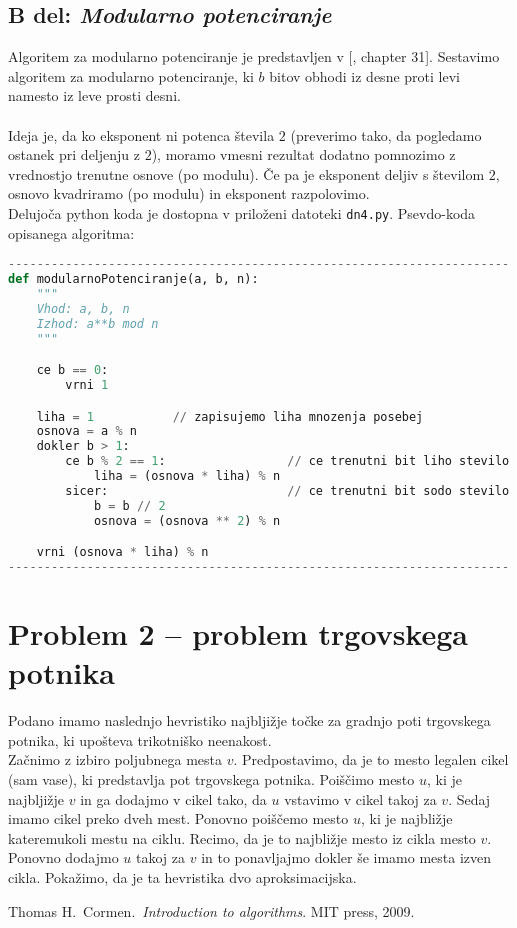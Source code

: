 \documentclass[a4paper,11pt]{article}
\begin{document}
\subsection*{B del: \textit{Modularno potenciranje}}
Algoritem za modularno potenciranje je predstavljen v [\cite{vir}, chapter 31]. Sestavimo algoritem za modularno potenciranje, ki $b$ bitov obhodi iz desne proti levi namesto iz leve prosti desni.
\\
\\
Ideja je, da ko eksponent ni potenca števila $2$ (preverimo tako, da pogledamo ostanek pri deljenju z $2$), 
moramo vmesni rezultat dodatno pomnozimo z vrednostjo trenutne osnove (po modulu). Če pa je eksponent deljiv s številom $2$, osnovo kvadriramo (po modulu) in eksponent razpolovimo.
\\
Delujoča python koda je dostopna v priloženi datoteki \texttt{dn4.py}. Psevdo-koda opisanega algoritma:
\newpage
\begin{lstlisting}[language = Python]
----------------------------------------------------------------------
def modularnoPotenciranje(a, b, n):
    """
    Vhod: a, b, n
    Izhod: a**b mod n
    """

    ce b == 0:
        vrni 1

    liha = 1           // zapisujemo liha mnozenja posebej
    osnova = a % n      
    dokler b > 1:
        ce b % 2 == 1:                 // ce trenutni bit liho stevilo
            liha = (osnova * liha) % n
        sicer:                         // ce trenutni bit sodo stevilo
            b = b // 2
            osnova = (osnova ** 2) % n

    vrni (osnova * liha) % n
----------------------------------------------------------------------

\end{lstlisting}


\section*{Problem 2 -- problem trgovskega potnika}

Podano imamo naslednjo hevristiko najbljižje točke za gradnjo poti
trgovskega potnika, ki upošteva trikotniško neenakost.
\\
Začnimo z izbiro poljubnega mesta $v$. Predpostavimo, da je to mesto
legalen cikel (sam vase), ki predstavlja pot trgovskega potnika. 
Poiščimo mesto $u$, ki je najbljižje $v$ in ga dodajmo v cikel tako, da $u$ vstavimo v cikel takoj za $v$. 
Sedaj imamo cikel preko dveh mest.
Ponovno poiščemo mesto $u$, ki je najbližje kateremukoli mestu na ciklu. 
Recimo, da je to najbližje mesto iz cikla mesto $v$. Ponovno dodajmo $u$ takoj za $v$ in to ponavljajmo dokler še imamo mesta izven cikla.
Pokažimo, da je ta hevristika dvo aproksimacijska.


\begin{thebibliography}{99}
    Thomas H.~Cormen.~\emph{Introduction to algorithms}. MIT press, 2009.

\end{thebibliography}
\end{document}

